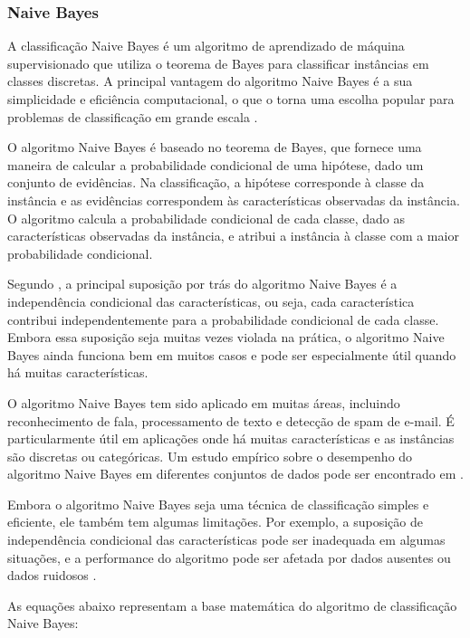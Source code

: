 \subsubsection{Naive Bayes}

A classificação Naive Bayes é um algoritmo de aprendizado de máquina supervisionado que utiliza o teorema de Bayes para classificar instâncias em classes discretas. A principal vantagem do algoritmo Naive Bayes é a sua simplicidade e eficiência computacional, o que o torna uma escolha popular para problemas de classificação em grande escala \citep{mitchell1997machine}.

O algoritmo Naive Bayes é baseado no teorema de Bayes, que fornece uma maneira de calcular a probabilidade condicional de uma hipótese, dado um conjunto de evidências. Na classificação, a hipótese corresponde à classe da instância e as evidências correspondem às características observadas da instância. O algoritmo calcula a probabilidade condicional de cada classe, dado as características observadas da instância, e atribui a instância à classe com a maior probabilidade condicional.

Segundo \cite{domingos1997optimality}, a principal suposição por trás do algoritmo Naive Bayes é a independência condicional das características, ou seja, cada característica contribui independentemente para a probabilidade condicional de cada classe. Embora essa suposição seja muitas vezes violada na prática, o algoritmo Naive Bayes ainda funciona bem em muitos casos e pode ser especialmente útil quando há muitas características.

O algoritmo Naive Bayes tem sido aplicado em muitas áreas, incluindo reconhecimento de fala, processamento de texto e detecção de spam de e-mail. É particularmente útil em aplicações onde há muitas características e as instâncias são discretas ou categóricas. Um estudo empírico sobre o desempenho do algoritmo Naive Bayes em diferentes conjuntos de dados pode ser encontrado em \citep{rish2001empirical}.

Embora o algoritmo Naive Bayes seja uma técnica de classificação simples e eficiente, ele também tem algumas limitações. Por exemplo, a suposição de independência condicional das características pode ser inadequada em algumas situações, e a performance do algoritmo pode ser afetada por dados ausentes ou dados ruidosos \citep{mitchell1997machine}.

As equações abaixo representam a base matemática do algoritmo de classificação Naive Bayes:

